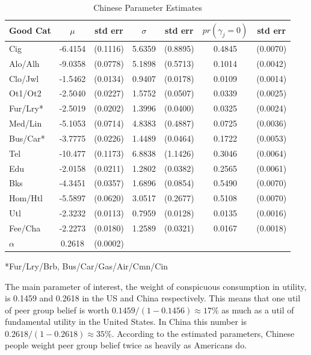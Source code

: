 \documentclass[12pt]{article}
\begin{document}
\begin{table}
    \begin{center}
	\begin{tabular}{|l|c c |c c |c c|}
		\hline
		Good Cat & $\mu$ & std err      & $\sigma$ & std err       & $pr(\gamma_j =  0)$ & std err\\
		\hline
		Cig         & -6.4154 &  (0.1116) & 5.6359 & (0.8895) & 0.4845 & (0.0070)\\ 
		\hline
		Alo/Alh     & -9.0358 &  (0.0778) & 5.1898 & (0.5713) & 0.1014 & (0.0042)\\ 
		\hline
		Clo/Jwl     & -1.5462 &  (0.0134) & 0.9407 & (0.0178) & 0.0109 & (0.0014)\\ 
		\hline
		Ot1/Ot2     & -2.5040 &  (0.0227) & 1.5752 & (0.0507) & 0.0339 & (0.0025)\\ 
		\hline
		Fur/Lry* & -2.5019 &  (0.0202) & 1.3996 & (0.0400) & 0.0325 & (0.0024)\\ 
		\hline
		Med/Lin     & -5.1053 &  (0.0714) & 4.8383 & (0.4887) & 0.0725 & (0.0036)\\ 
		\hline
		Bus/Car* & -3.7775 &  (0.0226) & 1.4489 & (0.0464) & 0.1722 & (0.0053)\\ 
		\hline
		Tel         & -10.477 &  (0.1173) & 6.8838 & (1.1426) & 0.3046 & (0.0064)\\ 
		\hline
		Edu         & -2.0158 &  (0.0211) & 1.2802 & (0.0382) & 0.2565 & (0.0061)\\ 
		\hline
		Bks         & -4.3451 &  (0.0357) & 1.6896 & (0.0854) & 0.5490 & (0.0070)\\ 
		\hline
		Hom/Htl     & -5.5897 &  (0.0620) & 3.0517 & (0.2677) & 0.5108 & (0.0070)\\ 
		\hline
		Utl         & -2.3232 &  (0.0113) & 0.7959 & (0.0128) & 0.0135 & (0.0016)\\ 
		\hline
		Fee/Cha     & -2.2273 &  (0.0180) & 1.2589 & (0.0321) & 0.0167 & (0.0018)\\ 
		\hline
	        \hline	
		$\alpha$ & 0.2618 & (0.0002) & & & & \\
		\hline
	\end{tabular}
     	\linebreak
	\small{*Fur/Lry/Brb, Bus/Car/Gas/Air/Cmn/Cin}
    \end{center}
    \caption{Chinese Parameter Estimates}
    \label{tab:chnparest}
\end{table}
The main parameter of interest, the weight of conspicuous consumption in utility, is 0.1459 and 0.2618 in the US and China respectively.  This means that one util of peer group belief is worth $0.1459/(1-0.1456) \approx 17\%$ as much as a util of fundamental utility in the United States.  In China this number is $0.2618/(1-0.2618) \approx 35\%$.  According to the estimated parameters, Chinese people weight peer group belief twice as heavily as Americans do.
\end{document}
